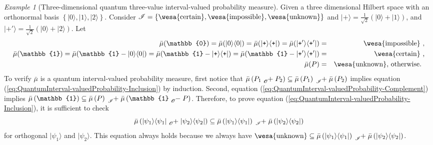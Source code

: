 \documentclass{article}
\theoremstyle{remark}
\newtheorem{example}{Example}
\newcommand{\ket}[1]{|#1\rangle}
\newcommand{\proj}[1]{|#1 \rangle\langle #1 |}
\newcommand{\ps}{\texttt{+}}
\newcommand{\imposs}{{\mbox{\wesa{impossible}}}}
\newcommand{\necess}{{\mbox{\wesa{certain}}}}
\newcommand{\unknown}{{\mbox{\wesa{unknown}}}}
\begin{document}
\begin{example}[Three-dimensional quantum three-value interval-valued
probability measure]\label{ex:three-dimensional-three-value} Given
a three dimensional Hilbert space with an orthonormal basis $\left\{ \ket{0},\ket{1},\ket{2}\right\} $.
Consider\emph{ $\mathscr{I}=\left\{ \necess,\imposs,\unknown\right\} $}
and $\ket{\ps}=\frac{1}{\sqrt{2}}(\ket{0}+\ket{1})$, and $\ket{\ps'}=\frac{1}{\sqrt{2}}(\ket{0}+\ket{2})$.
Let 
\begin{eqnarray*}
\bar{\mu}(\mathbb{0})=\bar{\mu}(\proj{0})=\bar{\mu}(\proj{\ps})=\bar{\mu}(\proj{\ps'}) & = & \imposs\textrm{ ,}\\
\bar{\mu}(\mathbb{1})=\bar{\mu}(\mathbb{1}-\proj{0})=\bar{\mu}(\mathbb{1}-\proj{\ps})=\bar{\mu}(\mathbb{1}-\proj{\ps'}) & = & \necess\textrm{ ,}\\
\bar{\mu}(P) & = & \unknown\textrm{, otherwise. }
\end{eqnarray*}
To verify $\bar{\mu}$ is a quantum interval-valued probability measure,
first notice that $\bar{\mu}\left(P_{1}\tensor*[_{\mathscr{O}}]{+}{}P_{2}\right)\subseteq\bar{\mu}\left(P_{1}\right)\tensor*[_{\mathscr{I}}]{+}{}\bar{\mu}\left(P_{2}\right)$
implies equation (\ref{eq:QuantumInterval-valuedProbability-Inclusion})
by induction. Second, equation (\ref{eq:QuantumInterval-valuedProbability-Complement})
implies $\bar{\mu}\left(\mathbb{1}\right)\subseteq\bar{\mu}\left(P\right)\tensor*[_{\mathscr{I}}]{+}{}\bar{\mu}\left(\mathbb{1}\tensor*[_{\mathscr{O}}]{-}{}P\right)$.
Therefore, to prove equation (\ref{eq:QuantumInterval-valuedProbability-Inclusion}),
it is sufficient to check 
\[
\bar{\mu}\left(\proj{\psi_{1}}\tensor*[_{\mathscr{O}}]{+}{}\proj{\psi_{2}}\right)\subseteq\bar{\mu}\left(\proj{\psi_{1}}\right)\tensor*[_{\mathscr{I}}]{+}{}\bar{\mu}\left(\proj{\psi_{2}}\right)
\]
for orthogonal $\ket{\psi_{1}}$ and $\ket{\psi_{2}}$. This equation
always holds because we always have $\unknown\subseteq\bar{\mu}\left(\proj{\psi_{1}}\right)\tensor*[_{\mathscr{I}}]{+}{}\bar{\mu}\left(\proj{\psi_{2}}\right)$.


\end{example}
\end{document}
